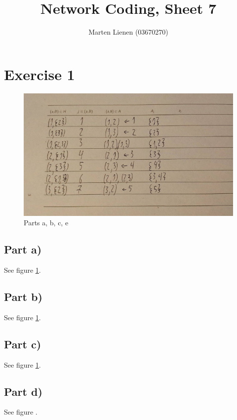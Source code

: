 \documentclass[10pt,a4paper]{article}
\title{Network Coding, Sheet 7}
\author{Marten Lienen (03670270)}
\begin{document}
\maketitle

\section*{Exercise 1}

\begin{figure}[h]
  \centering
  \includegraphics[width=\textwidth]{sheet-7/table}
  \caption{Parts a, b, c, e}
  \label{fig:table}
\end{figure}

\subsection*{Part a)}

See figure \ref{fig:table}.

\subsection*{Part b)}

See figure \ref{fig:table}.

\subsection*{Part c)}

See figure \ref{fig:table}.

\subsection*{Part d)}

See figure \label{fig:part-d}.
\end{document}
